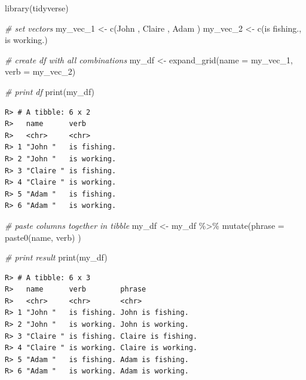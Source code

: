 \documentclass[
  12pt,
]{book}
\newenvironment{Shaded}{\begin{snugshade}}{\end{snugshade}}
\newcommand{\AttributeTok}[1]{\textcolor[rgb]{0.61,0.61,0.61}{#1}}
\newcommand{\CommentTok}[1]{\textcolor[rgb]{0.37,0.37,0.37}{\textit{#1}}}
\newcommand{\FunctionTok}[1]{\textcolor[rgb]{0,0,0}{#1}}
\newcommand{\NormalTok}[1]{#1}
\newcommand{\OtherTok}[1]{\textcolor[rgb]{0.37,0.37,0.37}{#1}}
\newcommand{\SpecialCharTok}[1]{\textcolor[rgb]{0,0,0}{#1}}
\newcommand{\StringTok}[1]{\textcolor[rgb]{0.5,0.5,0.5}{#1}}
\begin{document}
\begin{Shaded}
\begin{Highlighting}[]
\FunctionTok{library}\NormalTok{(tidyverse)}

\CommentTok{\# set vectors}
\NormalTok{my\_vec\_1 }\OtherTok{\textless{}{-}} \FunctionTok{c}\NormalTok{(}\StringTok{\textquotesingle{}John \textquotesingle{}}\NormalTok{, }\StringTok{\textquotesingle{}Claire \textquotesingle{}}\NormalTok{, }\StringTok{\textquotesingle{}Adam \textquotesingle{}}\NormalTok{)}
\NormalTok{my\_vec\_2 }\OtherTok{\textless{}{-}} \FunctionTok{c}\NormalTok{(}\StringTok{\textquotesingle{}is fishing.\textquotesingle{}}\NormalTok{, }\StringTok{\textquotesingle{}is working.\textquotesingle{}}\NormalTok{)}

\CommentTok{\# create df with all combinations}
\NormalTok{my\_df }\OtherTok{\textless{}{-}} \FunctionTok{expand\_grid}\NormalTok{(}\AttributeTok{name =}\NormalTok{ my\_vec\_1,}
                     \AttributeTok{verb =}\NormalTok{ my\_vec\_2)}

\CommentTok{\# print df}
\FunctionTok{print}\NormalTok{(my\_df)}
\end{Highlighting}
\end{Shaded}

\begin{verbatim}
R> # A tibble: 6 x 2
R>   name      verb       
R>   <chr>     <chr>      
R> 1 "John "   is fishing.
R> 2 "John "   is working.
R> 3 "Claire " is fishing.
R> 4 "Claire " is working.
R> 5 "Adam "   is fishing.
R> 6 "Adam "   is working.
\end{verbatim}

\begin{Shaded}
\begin{Highlighting}[]
\CommentTok{\# paste columns together in tibble}
\NormalTok{my\_df }\OtherTok{\textless{}{-}}\NormalTok{ my\_df }\SpecialCharTok{\%\textgreater{}\%}
  \FunctionTok{mutate}\NormalTok{(}\AttributeTok{phrase =} \FunctionTok{paste0}\NormalTok{(name, verb) )}

\CommentTok{\# print result}
\FunctionTok{print}\NormalTok{(my\_df)}
\end{Highlighting}
\end{Shaded}

\begin{verbatim}
R> # A tibble: 6 x 3
R>   name      verb        phrase            
R>   <chr>     <chr>       <chr>             
R> 1 "John "   is fishing. John is fishing.  
R> 2 "John "   is working. John is working.  
R> 3 "Claire " is fishing. Claire is fishing.
R> 4 "Claire " is working. Claire is working.
R> 5 "Adam "   is fishing. Adam is fishing.  
R> 6 "Adam "   is working. Adam is working.
\end{verbatim}
\end{document}
